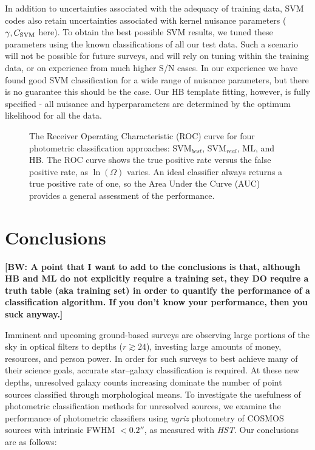 \documentclass[12pt,preprint]{aastex}
\newcommand\bw[1]{{\bf [BW: #1]}}
\begin{document}
In addition to uncertainties associated with the adequacy of training
data, SVM codes also retain uncertainties associated with kernel
nuisance parameters ($\gamma,C_{\rm SVM}$ here).  To obtain the best
possible SVM results, we tuned these parameters using the known
classifications of all our test data.  Such a scenario will not be
possible for future surveys, and will rely on tuning within the
training data, or on experience from much higher S/N cases.  In our
experience we have found good SVM classification for a wide range of
nuisance parameters, but there is no guarantee this should be the
case.  Our HB template fitting, however, is fully specified - all
nuisance and hyperparameters are determined by the optimum likelihood
for all the data.


\begin{figure}
\centering
\caption{The Receiver Operating Characteristic (ROC) curve for four photometric 
classification approaches: SVM$_{best}$, SVM$_{real}$, ML, and HB.  The ROC curve 
shows the true positive rate versus the false positive rate, as $\ln(\Omega)$ varies.  An ideal classifier 
always returns a true positive rate of one, so the Area Under the Curve (AUC) provides a 
general assessment of the performance.}
\label{fig:roc}
\end{figure}



\section{Conclusions}

\bw{A point that I want to add to the conclusions is that, although HB and ML do not explicitly require a training set, they DO require a truth table (aka training set) in order to quantify the performance of a classification algorithm.  If you don't know your performance, then you suck anyway.}

Imminent and upcoming ground-based surveys are observing large
portions of the sky in optical filters to depths ($r\gtrsim24$),
investing large amounts of money, resources, and person power.  In
order for such surveys to best achieve many of their science goals,
accurate star--galaxy classification is required.  At these new
depths, unresolved galaxy counts increasing dominate the number of
point sources classified through morphological means.  To investigate
the usefulness of photometric classification methods for unresolved
sources, we examine the performance of photometric classifiers using
{\it ugriz} photometry of COSMOS sources with intrinsic FWHM $<0.2''$,
as measured with {\it HST}.  Our conclusions are as follows:
\end{document}
